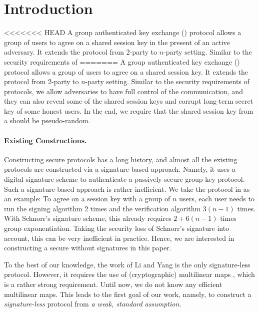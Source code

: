 \newcommand{\introGAKE}{\text{GAKE}\xspace}
\newcommand{\introAKE}{\text{AKE}\xspace}
\newcommand{\introNumSess}{s}
\newcommand{\introNumUser}{n}


\section{Introduction}\label{sec:introduction}
<<<<<<< HEAD
A group authenticated key exchange (\introGAKE) protocol allows a group of users to agree on a shared session key in the present of an active adversary. It extends the \introAKE protocol from 2-party to $n$-party setting. Similar to the security requirements of 
=======
A group authenticated key exchange (\introGAKE) protocol allows a group of users to agree on a shared session key. It extends the \introAKE protocol from 2-party to $n$-party setting. Similar to the security requirements of \introAKE protocols, we allow adversaries to have full control of the communication, and they can also reveal some of the shared session keys and corrupt long-term secret key of some honest users. 
In the end, we require that the shared session key from a \introGAKE should be pseudo-random.

\paragraph{Existing Constructions.}
Constructing secure \introGAKE protocols has a long history, and almost all the existing protocols \cite{CCS:BCPQ01,AC:BreChePoi01,EC:BreChePoi02,PQCRYPTO:ADGK19,JC:PanQiaRin22} are constructed via a signature-based approach. Namely, it uses a digital signature scheme to authenticate a passively secure group key protocol. Such a signature-based approach is rather inefficient. We take the protocol in \cite{JC:PanQiaRin22} as an example: To agree on a session key with a group of $n$ users, each user needs to run the signing algorithm 2 times and the verification algorithm $3(n-1)$ times. With Schnorr's signature scheme, this already requires $2+6(n-1)$ times group exponentiation. Taking the security loss of Schnorr's signature into account, this can be very inefficient in practice. Hence, we are interested in constructing a secure \introGAKE without signatures in this paper.

To the best of our knowledge, the work of Li and Yang \cite{CANS:LiYan13} is the only signature-less \introGAKE protocol. However, it requires the use of (cryptographic) multilinear maps \cite{EC:GarGenHal13}, which is a rather strong requirement. Until now, we do not know any efficient multilinear maps. This leads to the first goal of our work, namely, to construct a \textit{signature-less} \introGAKE protocol from \textit{a weak, standard assumption.}

